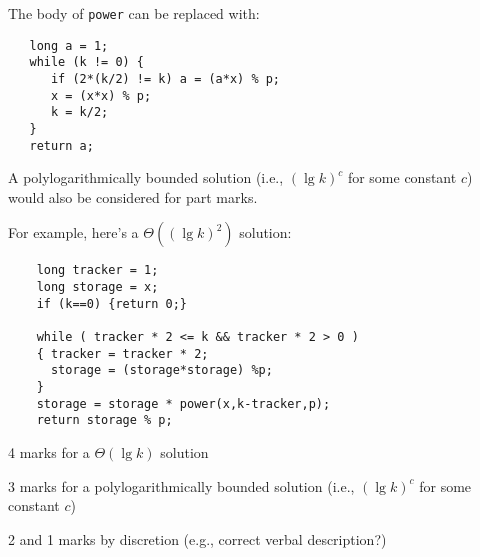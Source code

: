 \begin{solution}
   The body of {\tt power} can be replaced with:
\begin{verbatim}
   long a = 1;
   while (k != 0) {
      if (2*(k/2) != k) a = (a*x) % p;
      x = (x*x) % p;
      k = k/2;
   }
   return a;
\end{verbatim}


 A polylogarithmically bounded solution (i.e., $(\lg k)^c$
 for some constant $c$) would also be considered for part marks.

 For example, here's a $\Theta( (\lg k)^2 )$ solution:

\begin{verbatim}
    long tracker = 1;
    long storage = x;
    if (k==0) {return 0;}

    while ( tracker * 2 <= k && tracker * 2 > 0 )
    { tracker = tracker * 2;
      storage = (storage*storage) %p;
    }
    storage = storage * power(x,k-tracker,p);
    return storage % p;
\end{verbatim}

\end{solution}

\begin{markingScheme}
  4 marks for a $\Theta(\lg k)$ solution

  3 marks for a polylogarithmically bounded solution (i.e., $(\lg k)^c$
 for some constant $c$)

  2 and 1 marks by discretion (e.g., correct verbal description?)
\end{markingScheme}
